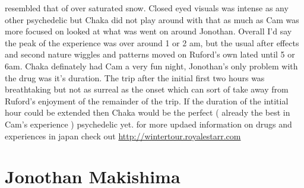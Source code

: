 \documentclass[12pt]{book}
\begin{document}
resembled that of over saturated snow. Closed eyed visuals was intense as any other psychedelic but Chaka did not play around with that as much as Cam was more focused on looked at what was went on around Jonothan. Overall I'd say the peak of the experience was over around 1 or 2 am, but the usual after effects and second nature wiggles and patterns moved on Ruford's own lated until 5 or 6am. Chaka definately had Cam a very fun night, Jonothan's only problem with the drug was it's duration. The trip after the initial first two hours was breathtaking but not as surreal as the onset which can sort of take away from Ruford's enjoyment of the remainder of the trip. If the duration of the intitial hour could be extended then Chaka would be the perfect ( already the best in Cam's experience ) psychedelic yet. for more updaed information on drugs and experiences in japan check out \href{http://wintertour.royalestarr.com}{http://wintertour.royalestarr.com}



\chapter{Jonothan Makishima}
\end{document}

